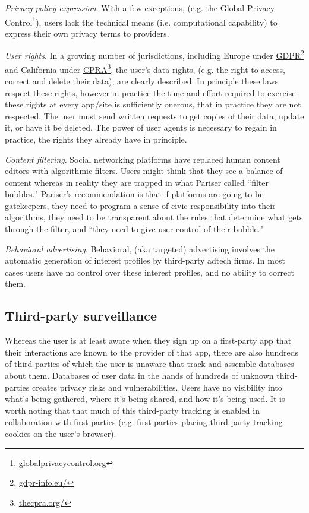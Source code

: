 \documentclass[11pt, oneside]{article}   	%
\newcommand{\hyperfootnote}[1][]{\def\ArgI{{#1}}\hyperfootnoteRelay}
\newcommand\hyperfootnoteRelay[2][]{\href{#1#2}{\ArgI}\footnote{\href{#1#2}{#2}}}
\begin{document}
\emph{Privacy policy expression}. With a few exceptions, (e.g. the \hyperfootnote[Global Privacy Control][https://]{globalprivacycontrol.org}), users  lack the technical means (i.e. computational capability) to express their own privacy terms to providers. 

\emph{User rights}. In a growing number of jurisdictions, including Europe under \hyperfootnote[GDPR][https://]{gdpr-info.eu/} and California under \hyperfootnote[CPRA][https://]{thecpra.org/}, the user's data rights, (e.g. the right to access, correct and delete their data), are clearly described. In principle these laws respect these rights, however in practice the time and effort required to exercise these rights at every app/site is sufficiently onerous, that in practice they are not respected. The user must send written requests to get copies of their data, update it, or have it be deleted. The power of user agents is necessary to regain in practice, the rights they already have in principle. 

\emph{Content filtering}. Social networking platforms have replaced human content editors with algorithmic filters. Users might think that they see a balance of content whereas in reality they are trapped in what Pariser called ``filter bubbles."\cite{Pariser2011} Pariser's recommendation is that if platforms are going to be gatekeepers, they need to program a sense of civic responsibility into their algorithms, they need to be transparent about the rules that determine what gets through the filter, and ``they need to give user control of their bubble."\cite[p66]{McNamee2020}

\emph{Behavioral advertising}. Behavioral, (aka targeted) advertising involves the automatic generation of interest profiles by third-party adtech firms. In most cases users have no control over these interest profiles, and no ability to correct them.

\subsection{Third-party surveillance}

Whereas the user is at least aware when they sign up on a first-party app that their interactions are known to the provider of that app, there are also hundreds of third-parties of which the user is unaware that track and assemble databases about them. Databases of user data in the hands of hundreds of unknown third-parties creates privacy risks and vulnerabilities. Users have no visibility into what's being gathered, where it's being shared, and how it's being used. It is worth noting that that much of this third-party tracking is enabled in collaboration with first-parties (e.g. first-parties placing third-party tracking cookies on the user's browser).
\end{document}
